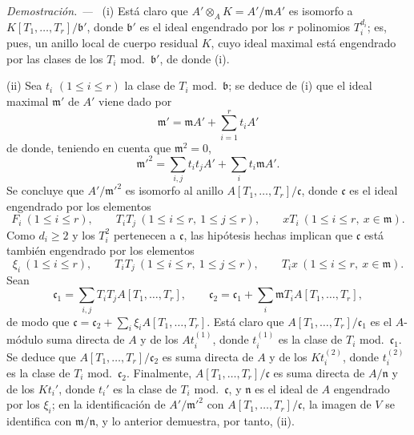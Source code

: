\documentclass[10pt,oneside]{book}
\newenvironment{proof}{%
  \par\medskip\noindent\textit{Demostración. ---\ }}{\par}
\begin{document}
\begin{proof}
(i) Está claro que $A'\otimes_AK=A'/\mathfrak mA'$ es isomorfo a
$K[T_1,\ldots,T_r]/\mathfrak b'$, donde $\mathfrak b'$ es el ideal engendrado
por los $r$ polinomios $T_i^{d_i}$; es, pues, un anillo local de cuerpo
residual $K$, cuyo ideal maximal está engendrado por las clases de los $T_i$
mod.~$\mathfrak b'$, de donde (i).

(ii) Sea $t_i$ $(1\leqslant i\leqslant r)$ la clase de $T_i$
mod.~$\mathfrak b$; se deduce de (i) que el ideal maximal $\mathfrak m'$ de
$A'$ viene dado por
\[
  \mathfrak m'=\mathfrak mA'+\sum_{i=1}^r t_iA'
\]
de donde, teniendo en cuenta que $\mathfrak m^2=0$,
\[
  \mathfrak m'^2=\sum_{i,j}t_it_jA'+\sum_i t_i\mathfrak mA'.
\]
Se concluye que $A'/\mathfrak m'^2$ es isomorfo al anillo
$A[T_1,\ldots,T_r]/\mathfrak c$, donde $\mathfrak c$ es el ideal engendrado por
los elementos
\[
  F_i\ (1\leqslant i\leqslant r),\qquad
  T_iT_j\ (1\leqslant i\leqslant r,\ 1\leqslant j\leqslant r),\qquad
  xT_i\ (1\leqslant i\leqslant r,\ x\in\mathfrak m).
\]
Como $d_i\geqslant2$ y los $T_i^2$ pertenecen a
$\mathfrak c$, las hipótesis hechas implican que $\mathfrak c$ está también
engendrado por los elementos
\[
  \xi_i\ (1\leqslant i\leqslant r),\qquad
  T_iT_j\ (1\leqslant i\leqslant r,\ 1\leqslant j\leqslant r),\qquad
  T_ix\ (1\leqslant i\leqslant r,\ x\in\mathfrak m).
\]
Sean
\[
  \mathfrak c_1=\sum_{i,j}T_iT_jA[T_1,\ldots,T_r],\qquad
  \mathfrak c_2=\mathfrak c_1+\sum_i\mathfrak mT_iA[T_1,\ldots,T_r],
\]
de modo que
$\mathfrak c=\mathfrak c_2+\sum_i\xi_iA[T_1,\ldots,T_r]$. Está claro que
$A[T_1,\ldots,T_r]/\mathfrak c_1$ es el $A$-módulo suma directa de $A$ y
de los $At_i^{(1)}$, donde $t_i^{(1)}$ es la clase de $T_i$
mod.~$\mathfrak c_1$. Se deduce que
$A[T_1,\ldots,T_r]/\mathfrak c_2$ es suma directa de $A$ y de los
$Kt_i^{(2)}$, donde $t_i^{(2)}$ es la clase de $T_i$
mod.~$\mathfrak c_2$. Finalmente, $A[T_1,\ldots,T_r]/\mathfrak c$ es suma
directa de $A/\mathfrak n$ y de los $Kt_i'$, donde $t_i'$ es la clase de $T_i$
mod.~$\mathfrak c$, y $\mathfrak n$ es el ideal de $A$ engendrado por los
$\xi_i$; en la identificación de $A'/\mathfrak m'^2$ con
$A[T_1,\ldots,T_r]/\mathfrak c$, la imagen de $V$ se identifica con
$\mathfrak m/\mathfrak n$, y lo anterior demuestra, por tanto, (ii).
\end{proof}
\end{document}
